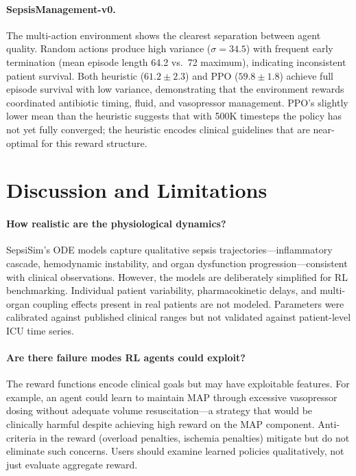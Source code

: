\documentclass[11pt,a4paper]{article}
\begin{document}
\paragraph{SepsisManagement-v0.} The multi-action environment shows the clearest separation between agent quality. Random actions produce high variance ($\sigma = 34.5$) with frequent early termination (mean episode length 64.2 vs.\ 72 maximum), indicating inconsistent patient survival. Both heuristic ($61.2 \pm 2.3$) and PPO ($59.8 \pm 1.8$) achieve full episode survival with low variance, demonstrating that the environment rewards coordinated antibiotic timing, fluid, and vasopressor management. PPO's slightly lower mean than the heuristic suggests that with 500K timesteps the policy has not yet fully converged; the heuristic encodes clinical guidelines that are near-optimal for this reward structure.

\section{Discussion and Limitations}

\paragraph{How realistic are the physiological dynamics?}
SepsiSim's ODE models capture qualitative sepsis trajectories---inflammatory cascade, hemodynamic instability, and organ dysfunction progression---consistent with clinical observations. However, the models are deliberately simplified for RL benchmarking. Individual patient variability, pharmacokinetic delays, and multi-organ coupling effects present in real patients are not modeled. Parameters were calibrated against published clinical ranges but not validated against patient-level ICU time series.

\paragraph{Are there failure modes RL agents could exploit?}
The reward functions encode clinical goals but may have exploitable features. For example, an agent could learn to maintain MAP through excessive vasopressor dosing without adequate volume resuscitation---a strategy that would be clinically harmful despite achieving high reward on the MAP component. Anti-criteria in the reward (overload penalties, ischemia penalties) mitigate but do not eliminate such concerns. Users should examine learned policies qualitatively, not just evaluate aggregate reward.
\end{document}
